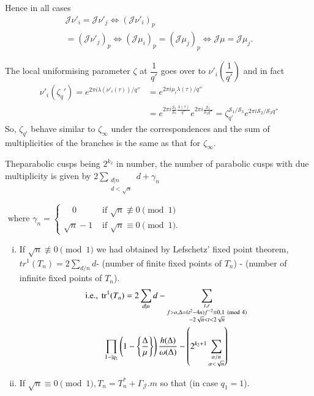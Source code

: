 Hence in all cases
\begin{multline*}
  \mathcal{J}\nu'_i = \mathcal{J}\nu'_j \Longleftrightarrow
  (\mathcal{J}\nu'_i)_p \\
  = (\mathcal{J}\nu'_j)_p
  \Longleftrightarrow (\mathcal{J}\mu_i)_p = (\mathcal{J}\mu_j)_p
  \Longleftrightarrow \mathcal{J}\mu = \mathcal{J}\mu_j. 
\end{multline*}

The local uniformising parameter $\zeta$ at $\dfrac{1}{q'}$ goes over
to $ \nu'_i \left(\dfrac{1}{q'}\right)$ and in fact 
\begin{align*}
  \nu'_i (\zeta_q') = e^{2 \pi i \lambda (\nu'_i (\tau))/q''}  & =
  e^{2 \pi i  \mu_i \lambda (\tau)/q''} \\ 
  & = e^{2 \pi i  \frac{\mathscr{S}_1}{\mathscr{S}_3}
    \frac{\lambda(\tau)}{q''}} e^{2 \pi i
    \frac{\mathscr{S}_1}{\mathscr{S}_3q''}}= \zeta^{\mathscr{S}_1 /
    \mathscr{S}_3}_{q'} e^{2 \pi i \mathscr{S}_2 /\mathscr{S}_3q''}   
\end{align*}
So, $\zeta_{q'}$ behave similar to $\zeta_\infty$ under the
correspondences and the sum of multiplicities of the branches is the
same as that for $\zeta_\infty$. 

The\pageoriginale parabolic cusps being $2^{k_2}$ in number, the number of parabolic
cusps with due multiplicity is given by $2 \sum \limits_{\substack {
    d| n \\ {d < \sqrt{n}}}} d + \gamma_n$  

$  \text{ where } \gamma_n =
  \begin{cases}
    \quad 0 & \text{ if } \sqrt{n} \not\equiv 0 \pmod 1 \\ 
    \sqrt{n}-1 & \text{ if } \sqrt{n} \equiv 0 \pmod 1. 
  \end{cases}
$
 
\begin{enumerate}[(i)]
\item If $\sqrt{n} \not\equiv 0 \pmod 1$ we had obtained by
  Lefschetz' fixed point theorem, $tr^1(T_n)= 2 \sum \limits_{d/n}d$-
  (number of finite fixed points of $T_n$) - (number of infinite fixed
  points of $T_n$). 
  \begin{multline*}
  \text{i.e.,}~ \operatorname{tr}^1(T_n) = 2 \sum_{d|n} d - \sum_{\substack {t,r \\ {f > o,
        \Delta = (t^2-4n)f^{-2}\equiv 0,1 \pmod 4 }\\ {-2 \sqrt{n} < t
        < 2 \sqrt{n}}}}\\ 
  \prod_{1-|q_1}
  \left(1-\left\{\frac{\Delta}{\mu}\right\}\right)
  \frac{h(\Delta)}{\omega(\Delta)} -\left(2^{k_2+1}
  \sum_{\substack{\alpha /n \\ { \alpha < \sqrt{n}}}}\right) 
  \end{multline*}
\item If $\sqrt{n} \equiv 0 \pmod 1, T_n = T^*_n +
  \Gamma_\mathcal{J}. m$ so that \qquad (in case $q_1 =1$). 
\end{enumerate}

